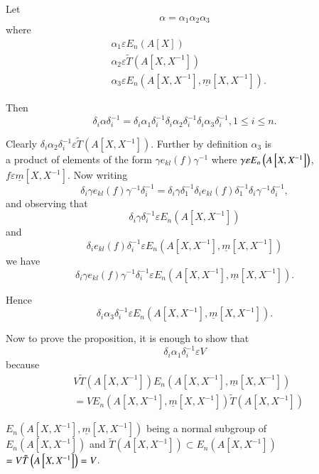 \begin{PRFF1}
Let 
$$
\alpha=\alpha_1\alpha_2\alpha_3
$$
where
$$
\begin{aligned}
&\alpha_1\varepsilon E_n(A[X])\\
&{}\alpha_2\varepsilon \tilde{T}\left(A\left[X,X^{-1}\right]\right)\\
&{}\alpha_3\varepsilon  E_n\left(A\left[X,X^{-1}\right],\underline{m}\left[X,X^{-1}\right]\right).
\end{aligned}
$$

Then
$$
\delta_i\alpha\delta^{-1}_i=\delta_i\alpha_1\delta^{-1}_i\delta_i\alpha_2\delta^{-1}_i\delta_i\alpha_3\delta^{-1}_i,1\leq
i \leq n.
$$

Clearly $\delta_i\alpha_2\delta^{-1}_i\varepsilon
\tilde{T}\left(A\left[X,X^{-1}\right]\right)$. Further by definition
$\alpha_3$ is\\ a product of elements of the form $\gamma
e_{kl}(f)\gamma^{-1}$ where $\gamma \varepsilon
\\E_n\left(A\left[X,X^{-1}\right]\right)$, $f\varepsilon
\underline{m}\left[X,X^{-1}\right]$. Now writing 
$$
\delta_i\gamma
e_{kl}(f)\gamma^{-1}\delta^{-1}_i=\delta_i\gamma\delta^{-1}_1\delta_ie_{kl}(f)\delta^{-1}_1\delta_{i}\gamma^{-1}\delta^{-1}_i,
$$
and observing that 
$$
\delta_i\gamma \delta^{-1}_i\varepsilon E_n\left(A\left[X,X^{-1}\right]\right)
$$
and 
$$
\delta_ie_{kl}(f)\delta^{-1}_i\varepsilon
E_n\left(A\left[X,X^{-1}\right], \underline{m}\left[X,X^{-1}\right]\right)
$$
we have
$$
\delta_i\gamma e_{kl}(f)\gamma^{-1}\delta^{-1}_i\varepsilon
E_n\left(A\left[X,X^{-1}\right],\underline{m}\left[X,X^{-1}\right]\right).
$$

Hence
$$
\delta_i\alpha_3\delta^{-1}_i\varepsilon E_n\left(A\left[X,X^{-1}\right],\underline{m}\left[X,X^{-1}\right]\right).
$$

Now to prove the proposition, it is enough to show that 
$$
\delta_i\alpha_1\delta^{-1}_i\varepsilon V
$$
because
$$
\begin{aligned}
&V\tilde{T}\left(A\left[X,X^{-1}\right]\right)E_n\left(A\left[X,X^{-1}\right],\underline{m}\left[X,X^{-1}\right]\right)\\
&{}= VE_n\left(A\left[X,X^{-1}\right],\underline{m}\left[X,X^{-1}\right]\right)\tilde{T}\left(A\left[X,X^{-1}\right]\right)
\end{aligned}
$$

$E_n\left(A\left[X,X^{-1}\right],\underline{m}\left[X,X^{-1}\right]\right)$
being a normal subgroup of \\$E_n\left(A\left[X,X^{-1}\right]\right)$
and $\tilde{T}\left(A\left[X,X^{-1}\right]\right)\subset
  E_n\left(A\left[X,X^{-1}\right]\right)$ $=
  \\V\tilde{T}\left(A\left[X,X^{-1}\right]\right)=V$.


\end{PRFF1}
